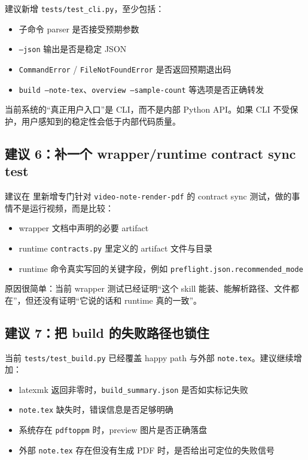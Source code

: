 \documentclass[a4paper]{article}
\begin{document}
建议新增 \texttt{tests/test\_cli.py}，至少包括：

\begin{itemize}
\item 子命令 parser 是否接受预期参数
\item \texttt{--json} 输出是否是稳定 JSON
\item \texttt{CommandError} / \texttt{FileNotFoundError} 是否返回预期退出码
\item \texttt{build --note-tex}、\texttt{overview --sample-count} 等选项是否正确转发
\end{itemize}

当前系统的“真正用户入口”是 CLI，而不是内部 Python API。如果 CLI 不受保护，用户感知到的稳定性会低于内部代码质量。

\subsection{建议 6：补一个 wrapper/runtime contract sync test}

建议在  里新增专门针对 \texttt{video-note-render-pdf} 的 contract sync 测试，做的事情不是运行视频，而是比较：

\begin{itemize}
\item wrapper 文档中声明的必要 artifact
\item runtime \texttt{contracts.py} 里定义的 artifact 文件与目录
\item runtime 命令真实写回的关键字段，例如 \texttt{preflight.json.recommended\_mode}
\end{itemize}

原因很简单：当前 wrapper 测试已经证明“这个 skill 能装、能解析路径、文件都在”，但还没有证明“它说的话和 runtime 真的一致”。

\subsection{建议 7：把 build 的失败路径也锁住}

当前 \texttt{tests/test\_build.py} 已经覆盖 happy path 与外部 \texttt{note.tex}。建议继续增加：

\begin{itemize}
\item latexmk 返回非零时，\texttt{build\_summary.json} 是否如实标记失败
\item \texttt{note.tex} 缺失时，错误信息是否足够明确
\item 系统存在 \texttt{pdftoppm} 时，preview 图片是否正确落盘
\item 外部 \texttt{note.tex} 存在但没有生成 PDF 时，是否给出可定位的失败信号
\end{itemize}
\end{document}
